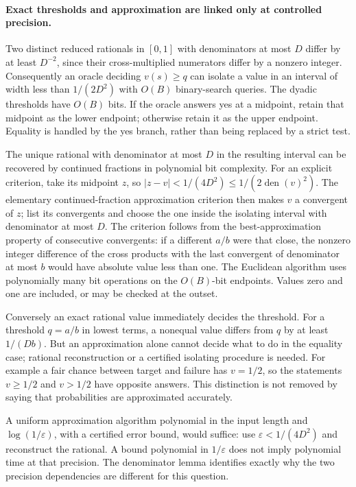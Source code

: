 \documentclass[11pt]{article}
\begin{document}
\paragraph{Exact thresholds and approximation are linked only at controlled precision.}
Two distinct reduced rationals in $[0,1]$ with denominators at most $D$
differ by at least $D^{-2}$, since their cross-multiplied numerators differ
by a nonzero integer. Consequently an oracle deciding $v(s)\geq q$
can isolate a value in an interval of width less than $1/(2D^2)$ with
$O(B)$ binary-search queries. The dyadic thresholds have $O(B)$ bits.
If the oracle answers yes at a midpoint, retain that midpoint as the
lower endpoint; otherwise retain it as the upper endpoint. Equality is
handled by the yes branch, rather than being replaced by a strict test.

The unique rational with denominator at most $D$ in the resulting interval
can be recovered by continued fractions in polynomial bit complexity.
For an explicit criterion, take its midpoint $z$, so
$|z-v|<1/(4D^2)\leq1/(2\operatorname{den}(v)^2)$. The elementary
continued-fraction approximation criterion then makes $v$ a convergent
of $z$; list its convergents and choose the one inside the isolating
interval with denominator at most $D$. The criterion follows from the
best-approximation property of consecutive convergents: if a different
$a/b$ were that close, the nonzero integer difference of the cross
products with the last convergent of denominator at most $b$ would have
absolute value less than one. The Euclidean algorithm uses polynomially
many bit operations on the $O(B)$-bit endpoints. Values zero and one
are included, or may be checked at the outset.

Conversely an exact rational value immediately decides the threshold.
For a threshold $q=a/b$ in lowest terms, a nonequal value differs from
$q$ by at least $1/(Db)$. But an approximation alone cannot decide
what to do in the equality case; rational reconstruction or a certified
isolating procedure is needed. For example a fair chance between target
and failure has $v=1/2$, so the statements $v\geq1/2$ and $v>1/2$
have opposite answers. This distinction is not removed by saying that
probabilities are approximated accurately.

A uniform approximation algorithm polynomial in the input length and
$\log(1/\varepsilon)$, with a certified error bound, would suffice:
use $\varepsilon<1/(4D^2)$ and reconstruct the rational. A bound
polynomial in $1/\varepsilon$ does not imply polynomial time at that
precision. The denominator lemma identifies exactly why the two precision
dependencies are different for this question.
\end{document}

